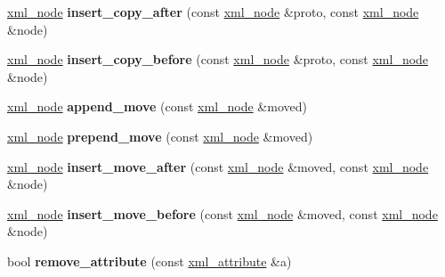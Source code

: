 \begin{DoxyCompactItemize}
\item 
\hypertarget{classpugi_1_1xml__node_a106a600eac7d08608f797d034b331fa8}{}\hyperlink{classpugi_1_1xml__node}{xml\+\_\+node} {\bfseries insert\+\_\+copy\+\_\+after} (const \hyperlink{classpugi_1_1xml__node}{xml\+\_\+node} \&proto, const \hyperlink{classpugi_1_1xml__node}{xml\+\_\+node} \&node)\label{classpugi_1_1xml__node_a106a600eac7d08608f797d034b331fa8}

\item 
\hypertarget{classpugi_1_1xml__node_a21134448747e00888df7ecfb174032d3}{}\hyperlink{classpugi_1_1xml__node}{xml\+\_\+node} {\bfseries insert\+\_\+copy\+\_\+before} (const \hyperlink{classpugi_1_1xml__node}{xml\+\_\+node} \&proto, const \hyperlink{classpugi_1_1xml__node}{xml\+\_\+node} \&node)\label{classpugi_1_1xml__node_a21134448747e00888df7ecfb174032d3}

\item 
\hypertarget{classpugi_1_1xml__node_a25af08bf4e45d2b0380328a0d9d08960}{}\hyperlink{classpugi_1_1xml__node}{xml\+\_\+node} {\bfseries append\+\_\+move} (const \hyperlink{classpugi_1_1xml__node}{xml\+\_\+node} \&moved)\label{classpugi_1_1xml__node_a25af08bf4e45d2b0380328a0d9d08960}

\item 
\hypertarget{classpugi_1_1xml__node_a400191f234f22efd0379e68700bf9650}{}\hyperlink{classpugi_1_1xml__node}{xml\+\_\+node} {\bfseries prepend\+\_\+move} (const \hyperlink{classpugi_1_1xml__node}{xml\+\_\+node} \&moved)\label{classpugi_1_1xml__node_a400191f234f22efd0379e68700bf9650}

\item 
\hypertarget{classpugi_1_1xml__node_a23ad17b7d7539169537d95f1fd1ec9b1}{}\hyperlink{classpugi_1_1xml__node}{xml\+\_\+node} {\bfseries insert\+\_\+move\+\_\+after} (const \hyperlink{classpugi_1_1xml__node}{xml\+\_\+node} \&moved, const \hyperlink{classpugi_1_1xml__node}{xml\+\_\+node} \&node)\label{classpugi_1_1xml__node_a23ad17b7d7539169537d95f1fd1ec9b1}

\item 
\hypertarget{classpugi_1_1xml__node_abf67ad284bfbdf8bc401e24b086cf45e}{}\hyperlink{classpugi_1_1xml__node}{xml\+\_\+node} {\bfseries insert\+\_\+move\+\_\+before} (const \hyperlink{classpugi_1_1xml__node}{xml\+\_\+node} \&moved, const \hyperlink{classpugi_1_1xml__node}{xml\+\_\+node} \&node)\label{classpugi_1_1xml__node_abf67ad284bfbdf8bc401e24b086cf45e}

\item 
\hypertarget{classpugi_1_1xml__node_aee02f0e2dab4aaeb6196f26b3bcf258c}{}bool {\bfseries remove\+\_\+attribute} (const \hyperlink{classpugi_1_1xml__attribute}{xml\+\_\+attribute} \&a)\label{classpugi_1_1xml__node_aee02f0e2dab4aaeb6196f26b3bcf258c}


\end{DoxyCompactItemize}
